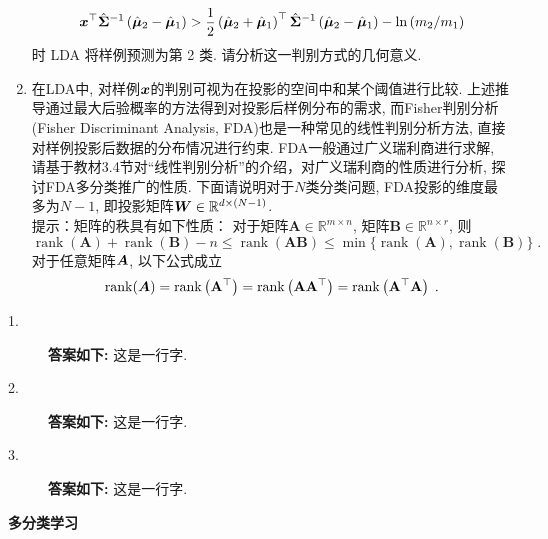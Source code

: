 \documentclass[answers]{exam}  %
\begin{document}
\begin{questions}
\begin{enumerate}
\begin{equation}
			      {\boldsymbol{x}}^{\top} \hat{\boldsymbol{\Sigma}}^{-1}\left(\hat{\boldsymbol{\mu}}_{2}-\hat{\boldsymbol{\mu}}_{1}\right)>\frac{1}{2}\left(\hat{\boldsymbol{\mu}}_{2}+\hat{\boldsymbol{\mu}}_{1}\right)^{\top} \hat{\boldsymbol{\Sigma}}^{-1}\left(\hat{\boldsymbol{\mu}}_{2}-\hat{\boldsymbol{\mu}}_{1}\right)-\ln \left(m_{2} / m_{1}\right)
		      \end{equation}时 LDA 将样例预测为第 2 类. 请分析这一判别方式的几何意义.
		\item 在LDA中, 对样例${\boldsymbol{x}}$的判别可视为在投影的空间中和某个阈值进行比较. 上述推导通过最大后验概率的方法得到对投影后样例分布的需求, 而Fisher判别分析 (Fisher Discriminant Analysis, FDA)也是一种常见的线性判别分析方法, 直接对样例投影后数据的分布情况进行约束.
		      FDA一般通过广义瑞利商进行求解, 请基于教材3.4节对“线性判别分析”的介绍，对广义瑞利商的性质进行分析, 探讨FDA多分类推广的性质.
		      下面请说明对于$N$类分类问题, FDA投影的维度最多为$N-1$, 即投影矩阵$\boldsymbol{W}\in\mathbb{R}^{d\times (N-1)}$.\\
		      提示：矩阵的秩具有如下性质：
		      对于矩阵$\mathbf{A}\in\mathbb{R}^{m \times n}$, 矩阵$\mathbf{B}\in\mathbb{R}^{n \times r}$, 则
		      \begin{equation}
			      \operatorname{rank}(\mathbf{A})+\operatorname{rank}(\mathbf{B})-n \leq \operatorname{rank}(\mathbf{A B}) \leq \min \{\operatorname{rank}(\mathbf{A}), \operatorname{rank}(\mathbf{B})\}\;.
		      \end{equation}
		      对于任意矩阵$\boldsymbol{A}$, 以下公式成立
		      \begin{equation}
			      \operatorname{rank}(\boldsymbol{A})=\operatorname{rank}\left(\mathbf{A}^{\top}\right)=\operatorname{rank}\left(\mathbf{A} \mathbf{A}^{\top}\right)=\operatorname{rank}\left(\mathbf{A}^{\top} \mathbf{A}\right)\;.
		      \end{equation}
	\end{enumerate}
	\begin{solution}
		\begin{description}
			\item[1.] \textbf{答案如下:}
			      这是一行字.
			\item[2.] \textbf{答案如下:}
			      这是一行字.
			\item[3.] \textbf{答案如下:}
			      这是一行字.
		\end{description}
	\end{solution}


	\question [20] \textbf{多分类学习}


\end{questions}
\end{document}
